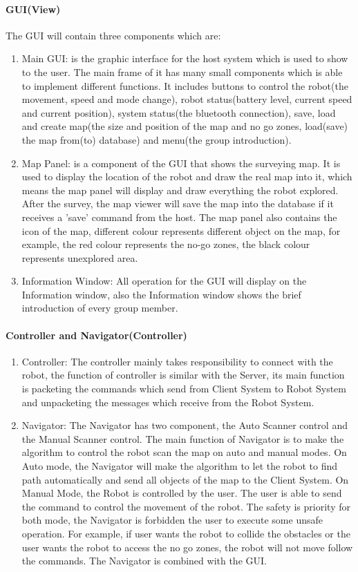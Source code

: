 \documentclass[11pt, a4paper]{report}
\begin{document}
\paragraph{GUI(View)} The GUI will contain three components which are:
\begin{enumerate}
\item Main GUI: is the graphic interface for the host system which is used to show to the user. The main frame of it has many small components which is able to implement different functions. It includes buttons to control the robot(the movement, speed and mode change), robot status(battery level, current
speed and current position), system status(the bluetooth connection), save, load and create
map(the size and position of the map and no go zones, load(save) the map from(to) database)
and menu(the group introduction). 
\item Map Panel: is a component of the GUI that shows the surveying map. It is used to display
the location of the robot and draw the real map into it, which means the map panel will display
and draw everything the robot explored. After the survey, the map viewer will save the map
into the database if it receives a 'save' command from the host. The map panel also contains
the icon of the map, different colour represents different object on the map, for example, the
red colour represents the no-go zones, the black colour represents unexplored area.
\item Information Window: All operation for the GUI will display on the Information window,
also the Information window shows the brief introduction of every group member.
\end{enumerate}
\paragraph{Controller and Navigator(Controller)}
\begin{enumerate}
\item Controller: The controller mainly takes responsibility to connect with the robot, the function of controller is similar with the Server, its main function is packeting the commands which send from Client System to Robot System and unpacketing  the messages which receive from the Robot System.
\item Navigator: The Navigator has two component, the Auto Scanner control and the Manual Scanner control. The main function of Navigator is to make the algorithm to control the robot scan the map on auto and manual modes. On Auto mode, the Navigator will make the algorithm to let the robot to find path automatically  and send all objects of the map to the Client System. On Manual Mode, the Robot is controlled by the user. The user is able to send the command to control the movement of the robot. The safety is priority for both mode, the Navigator is forbidden the user to execute some unsafe operation. For example, if user wants the robot to collide the obstacles or the user wants the robot to access the no go zones, the robot will not move follow the commands. The Navigator is combined with  the GUI.    
\end{enumerate}
\end{document}
